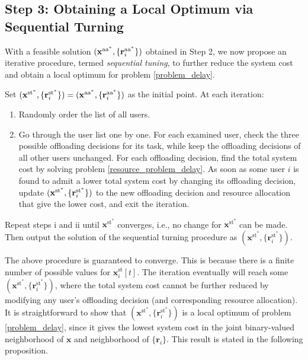 \documentclass[10pt,journal,compsoc]{IEEEtran}
\def\rbf{{\bf r}}
\def\xbf{{\bf x}}
\def\rbf{{\bf r}}
\def\xbf{{\bf x}}
\begin{document}
{\subsection{Step 3: Obtaining a Local Optimum via Sequential Turning}
With a feasible solution
$(\xbf^{\text{aa}^*},\{\rbf^{\text{aa}^*}_i\})$ obtained in Step 2,
we now propose an iterative procedure, termed \textit{sequential
tuning}, to further reduce the system cost and obtain
 a local optimum for problem \eqref{problem_delay}.

Set
$(\mathbf{x}^{\text{st}^*},\{\rbf^{\text{st}^*}_i\})=(\xbf^{\text{aa}^*},\{\rbf^{\text{aa}^*}_i\})$
as the initial point. At each iteration:
\renewcommand{\labelenumi}{\roman{enumi}}
 \begin{enumerate}
 \item Randomly order the list of all users.
 \item Go through the user list one by one. For each examined user, check
 the three possible offloading decisions for its task, while keep the offloading decisions
 of all other users unchanged. For each offloading decision, find the total system
 cost by solving problem \eqref{resource_problem_delay}. As soon as some user $i$ is found
 to admit a lower total system cost by changing its offloading decision,
 update $(\mathbf{x}^{\text{st}^*},\{\rbf^{\text{st}^*}_i\})$ to the new offloading decision
 and resource allocation that give the lower cost, and exit the
 iteration.
 \end{enumerate}
Repeat steps i and ii until $\mathbf{x}^{\text{st}^*}$ converges,
i.e., no change
 for $\mathbf{x}^{\text{st}^*}$ can be made. Then output the solution of the sequential turning procedure as
$(\mathbf{x}^{\text{st}^*},\{\mathbf{r}_i^{\text{st}^*}\})$.



The above procedure is guaranteed to converge. This is because there
is a finite
 number of possible values for $\mathbf{x}^{\text{st}}_i[t]$. The iteration eventually will reach some
$(\mathbf{x}^{\text{st}^*},\{\mathbf{r}_i^{\text{st}^*}\})$, where
the total system cost cannot be further reduced by modifying any
user's offloading decision (and corresponding resource allocation).
It is straightforward to show that
$(\mathbf{x}^{\text{st}^*},\{\mathbf{r}_i^{\text{st}^*}\})$ is a
local optimum of problem \eqref{problem_delay}, since it gives the
lowest system cost in the joint binary-valued neighborhood of
$\mathbf{x}$ and neighborhood of $\{\mathbf{r}_i\}$. This result is
stated in the following proposition.

}
\end{document}
